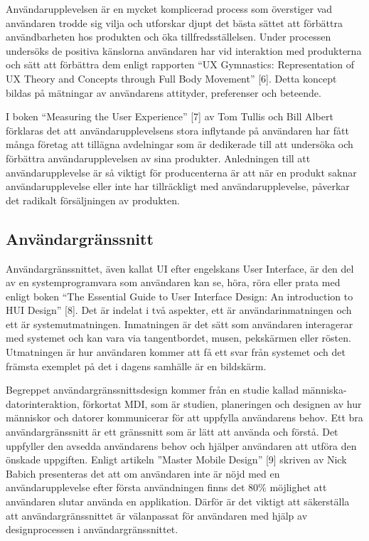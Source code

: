 \documentclass[12pt]{kththesis}
\begin{document}
Användarupplevelsen är en mycket komplicerad process som överstiger vad användaren trodde sig vilja och utforskar djupt det bästa sättet att förbättra användbarheten hos produkten och öka tillfredsställelsen. Under processen undersöks de positiva känslorna användaren har vid interaktion med produkterna och sätt att förbättra dem enligt rapporten “UX Gymnastics: Representation of UX Theory and Concepts through Full Body Movement” [6]. Detta koncept bildas på mätningar av användarens attityder, preferenser och beteende. 

I boken “Measuring the User Experience” [7] av Tom Tullis och Bill Albert förklaras det att användarupplevelsens stora inflytande på användaren har fått många företag att tillägna avdelningar som är dedikerade till att undersöka och förbättra användarupplevelsen av sina produkter. Anledningen till att användarupplevelse är så viktigt för producenterna är att när en produkt saknar användarupplevelse eller inte har tillräckligt med användarupplevelse, påverkar det radikalt försäljningen av produkten. 

\subsection{Användargränssnitt}
Användargränssnittet, även kallat UI efter engelskans User Interface, är den del av en systemprogramvara som användaren kan se, höra, röra eller prata med enligt boken “The Essential Guide to User Interface Design: An introduction to HUI Design” [8]. Det är indelat i två aspekter, ett är användarinmatningen och ett är systemutmatningen. Inmatningen är det sätt som användaren interagerar med systemet och kan vara via tangentbordet, musen, pekskärmen eller rösten. Utmatningen är hur användaren kommer att få ett svar från systemet och det främsta exemplet på det i dagens samhälle är en bildskärm. 

Begreppet användargränssnittsdesign kommer från en studie kallad människa-datorinteraktion, förkortat MDI, som är studien, planeringen och designen av hur människor och datorer kommunicerar för att uppfylla användarens behov. Ett bra användargränssnitt är ett gränssnitt som är lätt att använda och förstå. Det uppfyller den avsedda användarens behov och hjälper användaren att utföra den önskade uppgiften. Enligt artikeln ”Master Mobile Design” [9] skriven av Nick Babich presenteras det att om användaren inte är nöjd med en användarupplevelse efter första användningen finns det 80\% möjlighet att användaren slutar använda en applikation. Därför är det viktigt att säkerställa att användargränssnittet är välanpassat för användaren med hjälp av designprocessen i användargränssnittet.
\end{document}
